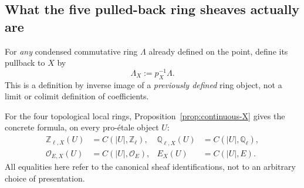 \documentclass[11pt,a4paper]{article}
\numberwithin{equation}{section}
\theoremstyle{definition}
\theoremstyle{remark}
\newcommand{\OO}{\mathcal O}
\begin{document}
\subsection{What the five pulled-back ring sheaves actually are}

For \emph{any} condensed commutative ring $\Lambda$ already defined on
the point, define its pullback to $X$ by
\begin{equation}\label{eq:LambdaX}
                  \boxed{\quad\Lambda_X:=p_X^{-1}\Lambda.\quad}
\end{equation}
This is a definition by inverse image of a \emph{previously defined}
ring object, not a limit or colimit definition of coefficients.

For the four topological local rings, Proposition~\ref{prop:continuous-X}
gives the concrete formula, on every pro-\'{e}tale object $U$:
\begin{align*}
 \mathbb Z_{\ell,X}(U)&=C(|U|,\mathbb Z_\ell),
 &\mathbb Q_{\ell,X}(U)&=C(|U|,\mathbb Q_\ell),\\
 \OO_{E,X}(U)&=C(|U|,\OO_E),
 &E_X(U)&=C(|U|,E).
\end{align*}
All equalities here refer to the canonical sheaf identifications, not
to an arbitrary choice of presentation.
\end{document}

